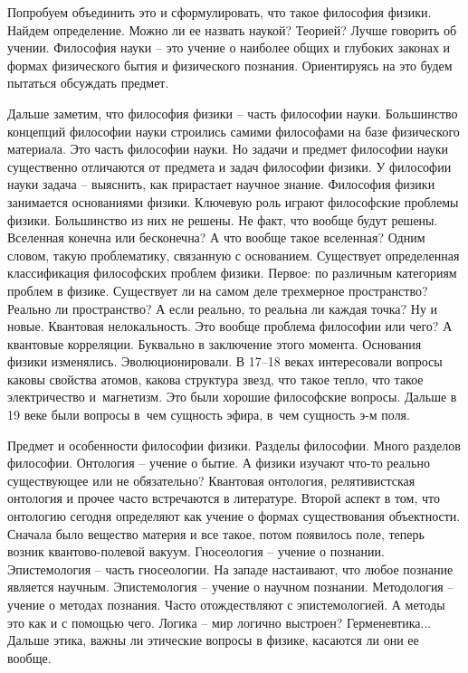 \documentclass[a4paper, 12pt]{article}
\begin{document}
Попробуем объединить это и сформулировать, что такое философия физики. 
Найдем определение. Можно ли ее назвать наукой? Теорией? Лучше говорить 
об учении. Философия науки -- это учение о наиболее общих и глубоких 
законах и формах физического бытия и физического познания.
%
Ориентируясь на это будем пытаться обсуждать предмет.

Дальше заметим, что философия физики -- часть философии науки. 
Большинство концепций философии науки строились самими философами на 
базе физического материала. Это часть философии науки. Но задачи 
и предмет философии науки существенно отличаются от предмета и задач 
философии физики. У философии науки задача -- выяснить, как прирастает 
научное знание. Философия физики занимается основаниями физики. Ключевую 
роль играют философские проблемы физики. Большинство из них не решены. 
Не факт, что вообще будут решены. Вселенная конечна или бесконечна? 
А что вообще такое вселенная? Одним словом, такую проблематику, 
связанную с основанием.
%
Существует определенная классификация философских проблем физики. 
Первое: по различным категориям проблем в физике. Существует ли на самом 
деле трехмерное пространство? Реально ли пространство? А если реально, 
то реальна ли каждая точка? Ну и новые. Квантовая нелокальность. Это 
вообще проблема философии или чего? А квантовые корреляции.
%
Буквально в заключение этого момента. Основания физики изменялись. 
Эволюционировали. В 17--18 веках интересовали вопросы каковы свойства 
атомов, какова структура звезд, что такое тепло, что такое электричество 
и~магнетизм. Это были хорошие философские вопросы. Дальше в 19 веке были 
вопросы в~чем сущность эфира, в~чем сущность э-м поля.

Предмет и особенности философии физики. Разделы философии. Много 
разделов философии.
%
Онтология -- учение о бытие. А физики изучают что-то реально 
существующее или не обязательно? Квантовая онтология, релятивистская 
онтология и прочее часто встречаются в литературе. Второй аспект в том, 
что онтологию сегодня определяют как учение о формах существования 
объектности. Сначала было вещество материя и все такое, потом появилось 
поле, теперь возник квантово-полевой вакуум.
%
Гносеология -- учение о познании. Эпистемология -- часть гносеологии. На 
западе настаивают, что любое познание является научным.
%
Эпистемология -- учение о научном познании.
%
Методология -- учение о методах познания. Часто отождествляют 
с эпистемологией. А методы это как и с помощью чего.
%
Логика -- мир логично выстроен?
%
Герменевтика...
%
Дальше этика, важны ли этические вопросы в физике, касаются ли они ее 
вообще.
\end{document}
